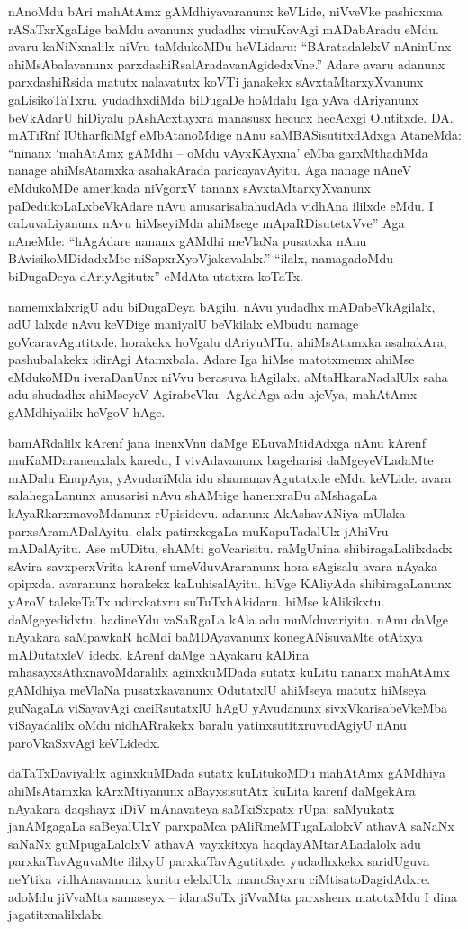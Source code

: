 nAnoMdu bAri mahAtAmx gAMdhiyavaranunx keVLide, niVveVke pashicxma rASaTxrXgaLige baMdu avanunx yudadhx vimuKavAgi mADabAradu eMdu. avaru kaNiNxnalilx niVru taMdukoMDu heVLidaru: ``BAratadalelxV nAninUnx ahiMsAbalavanunx parxdashiRsalAradavanAgidedxVne.'' Adare avaru adanunx parxdashiRsida matutx nalavatutx koVTi janakekx sAvxtaMtarxyXvanunx gaLisikoTaTxru. yudadhxdiMda biDugaDe hoMdalu Iga yAva dAriyanunx beVkAdarU hiDiyalu pAshAcxtayxra manasusx hecucx hecAcxgi Olutitxde. DA. mATiRnf lUtharfkiMgf eMbAtanoMdige nAnu saMBASisutitxdAdxga AtaneMda: ``ninanx `mahAtAmx gAMdhi -- oMdu vAyxKAyxna' eMba garxMthadiMda nanage ahiMsAtamxka asahakArada paricayavAyitu. Aga nanage nAneV eMdukoMDe amerikada niVgorxV tananx sAvxtaMtarxyXvanunx paDedukoLaLxbeVkAdare nAvu anusarisabahudAda vidhAna ililxde eMdu. I caLuvaLiyanunx nAvu hiMseyiMda ahiMsege mApaRDisutetxVve'' Aga nAneMde: ``hAgAdare nananx gAMdhi meVlaNa pusatxka nAnu BAvisikoMDidadxMte niSapxrXyoVjakavalalx.'' ``ilalx, namagadoMdu biDugaDeya dAriyAgitutx'' eMdAta utatxra koTaTx.

namemxlalxrigU adu biDugaDeya bAgilu. nAvu yudadhx mADabeVkAgilalx, adU lalxde nAvu keVDige maniyalU beVkilalx eMbudu namage goVcaravAgutitxde. horakekx hoVgalu dAriyuMTu, ahiMsAtamxka asahakAra, pashubalakekx idirAgi Atamxbala. Adare Iga hiMse matotxmemx ahiMse eMdukoMDu iveraDanUnx niVvu berasuva hAgilalx. aMtaHkaraNadalUlx saha adu shudadhx ahiMseyeV AgirabeVku. AgAdAga adu ajeVya, mahAtAmx gAMdhiyalilx heVgoV hAge. 

bamARdalilx kArenf jana inenxVnu daMge ELuvaMtidAdxga nAnu kArenf muKaMDaranenxlalx karedu, I vivAdavanunx bageharisi daMgeyeVLadaMte mADalu EnupAya, yAvudariMda idu shamanavAgutatxde eMdu keVLide. avara salahegaLanunx anusarisi nAvu shAMtige hanenxraDu aMshagaLa kAyaRkarxmavoMdanunx rUpisidevu. adanunx AkAshavANiya mUlaka parxsAramADalAyitu. elalx patirxkegaLa muKapuTadalUlx jAhiVru mADalAyitu. Ase mUDitu, shAMti goVcarisitu. raMgUnina shibiragaLalilxdadx sAvira savxperxVrita kArenf umeVduvAraranunx hora sAgisalu avara nAyaka opipxda. avaranunx horakekx kaLuhisalAyitu. hiVge KAliyAda shibiragaLanunx yAroV talekeTaTx udirxkatxru suTuTxhAkidaru. hiMse kAlikikxtu. daMgeyedidxtu. hadineYdu vaSaRgaLa kAla adu muMduvariyitu. nAnu daMge nAyakara saMpawkaR hoMdi baMDAyavanunx konegANisuvaMte otAtxya mADutatxleV idedx. kArenf daMge nAyakaru kADina rahasayxsAthxnavoMdaralilx aginxkuMDada sutatx kuLitu nananx mahAtAmx gAMdhiya meVlaNa pusatxkavanunx OdutatxlU ahiMseya matutx hiMseya guNagaLa viSayavAgi caciRsutatxlU hAgU yAvudanunx  sivxVkarisabeVkeMba viSayadalilx oMdu nidhARrakekx baralu yatinxsutitxruvudAgiyU nAnu paroVkaSxvAgi keVLidedx.

daTaTxDaviyalilx aginxkuMDada sutatx kuLitukoMDu mahAtAmx gAMdhiya ahiMsAtamxka kArxMtiyanunx aBayxsisutAtx kuLita karenf daMgekAra nAyakara daqshayx iDiV mAnavateya saMkiSxpatx rUpa; saMyukatx janAMgagaLa saBeyalUlxV parxpaMca pAliRmeMTugaLalolxV athavA saNaNx saNaNx guMpugaLalolxV athavA vayxkitxya haqdayAMtarALadalolx adu parxkaTavAguvaMte ililxyU parxkaTavAgutitxde. yudadhxkekx saridUguva neYtika vidhAnavanunx kuritu elelxlUlx manuSayxru ciMtisatoDagidAdxre. adoMdu jiVvaMta samaseyx -- idaraSuTx jiVvaMta parxshenx matotxMdu I dina jagatitxnalilxlalx.


